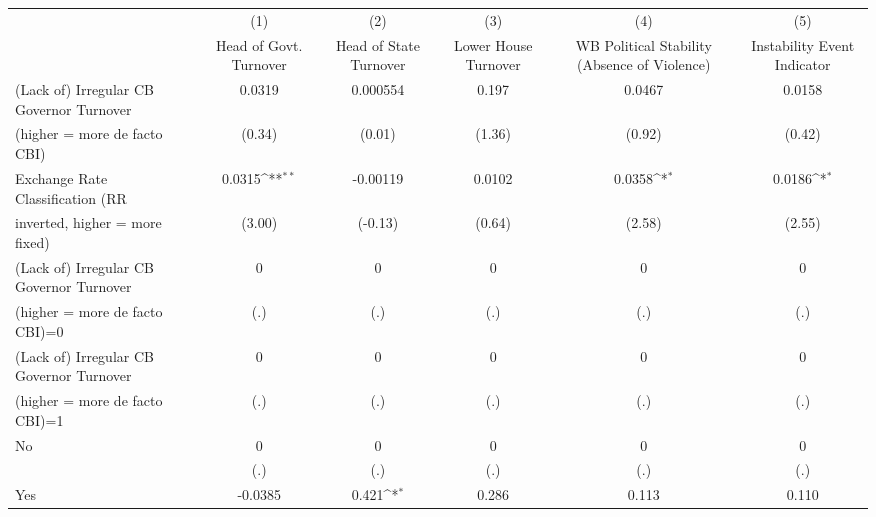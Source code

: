 {
\def\sym#1{\ifmmode^{#1}\else\(^{#1}\)\fi}
\begin{tabular}{l*{5}{c}}
\toprule
                                        &\multicolumn{1}{c}{(1)}&\multicolumn{1}{c}{(2)}&\multicolumn{1}{c}{(3)}&\multicolumn{1}{c}{(4)}&\multicolumn{1}{c}{(5)}\\
                                        &\multicolumn{1}{c}{Head of Govt. Turnover}&\multicolumn{1}{c}{Head of State Turnover}&\multicolumn{1}{c}{Lower House Turnover}&\multicolumn{1}{c}{WB Political Stability (Absence of Violence)}&\multicolumn{1}{c}{Instability Event Indicator}\\
\midrule
(Lack of) Irregular CB Governor Turnover&    0.0319         &  0.000554         &     0.197         &    0.0467         &    0.0158         \\
(higher = more de facto CBI)            &    (0.34)         &    (0.01)         &    (1.36)         &    (0.92)         &    (0.42)         \\
\addlinespace
Exchange Rate Classification (RR        &    0.0315\sym{**} &  -0.00119         &    0.0102         &    0.0358\sym{*}  &    0.0186\sym{*}  \\
inverted, higher = more fixed)          &    (3.00)         &   (-0.13)         &    (0.64)         &    (2.58)         &    (2.55)         \\
\addlinespace
(Lack of) Irregular CB Governor Turnover&         0         &         0         &         0         &         0         &         0         \\
(higher = more de facto CBI)=0          &       (.)         &       (.)         &       (.)         &       (.)         &       (.)         \\
\addlinespace
(Lack of) Irregular CB Governor Turnover&         0         &         0         &         0         &         0         &         0         \\
(higher = more de facto CBI)=1          &       (.)         &       (.)         &       (.)         &       (.)         &       (.)         \\
\addlinespace
No                                      &         0         &         0         &         0         &         0         &         0         \\
                                        &       (.)         &       (.)         &       (.)         &       (.)         &       (.)         \\
\addlinespace
Yes                                     &   -0.0385         &     0.421\sym{*}  &     0.286         &     0.113         &     0.110         \\

\end{tabular}}
